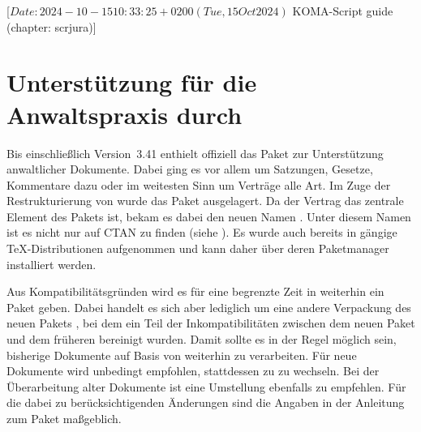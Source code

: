 %
%
%
%
%
%
%

%
                 [$Date: 2024-10-15 10:33:25 +0200 (Tue, 15 Oct 2024) $
                  KOMA-Script guide (chapter: scrjura)]

\chapter{Unterstützung für die Anwaltspraxis durch }
\BeginIndexGroup
{}

Bis einschließlich Version~3.41 enthielt \KOMAScript{} offiziell das Paket
 zur Unterstützung anwaltlicher Dokumente. Dabei ging es vor
allem um Satzungen, Gesetze, Kommentare dazu oder im weitesten Sinn um
Verträge alle Art. Im Zuge der Restrukturierung von \KOMAScript{} wurde das
Paket ausgelagert. Da der Vertrag das zentrale Element des Pakets ist, bekam
es dabei den neuen Namen . Unter diesem Namen ist es nicht
nur auf CTAN zu finden (siehe \cite{package:contract}). Es wurde auch bereits
in gängige \TeX-Distributionen aufgenommen und kann daher über deren
Paketmanager installiert werden.

Aus Kompatibilitätsgründen wird es für eine begrenzte Zeit in \KOMAScript{}
weiterhin ein Paket  geben. Dabei handelt es sich aber
lediglich um eine andere Verpackung des neuen Pakets , bei
dem ein Teil der Inkompatibilitäten zwischen dem neuen Paket und dem früheren
 bereinigt wurden. Damit sollte es in der Regel möglich sein,
bisherige Dokumente auf Basis von  weiterhin zu
verarbeiten. Für neue Dokumente wird unbedingt empfohlen, stattdessen zu
 zu wechseln. Bei der Überarbeitung alter Dokumente ist eine
Umstellung ebenfalls zu empfehlen. Für die dabei zu berücksichtigenden
Änderungen sind die Angaben in der Anleitung zum Paket 
maßgeblich.

